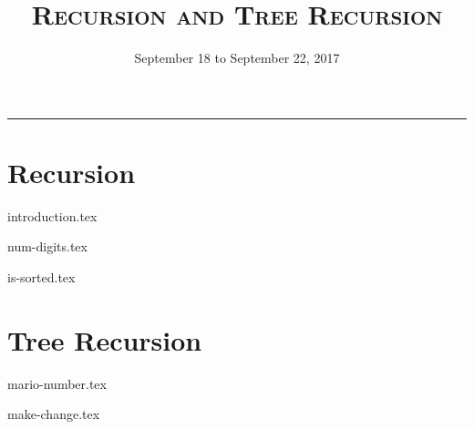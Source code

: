 \documentclass{exam}
\title{\textsc{Recursion and Tree Recursion}}
\date{September 18 to September 22, 2017}
\begin{document}
\maketitle
\rule{\textwidth}{0.15em}
\fontsize{12}{15}\selectfont


\section{Recursion}
{introduction.tex}
\begin{questions}
{num-digits.tex}

\begin{blocksection}
{is-sorted.tex}

\end{blocksection}

\section{Tree Recursion}
{mario-number.tex}

{make-change.tex}



\end{questions}
\end{document}
